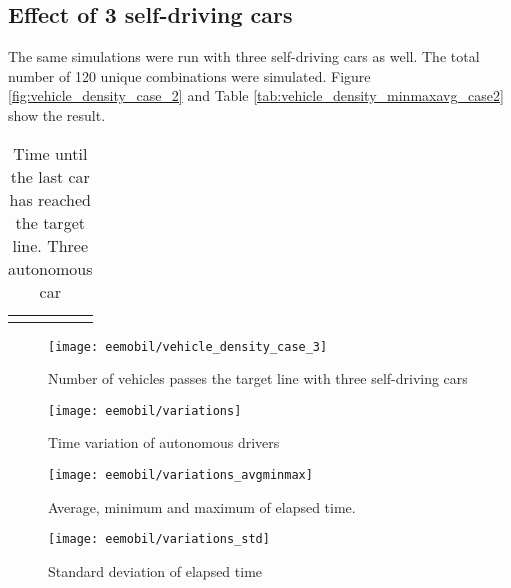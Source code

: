 		\subsection{Effect of 3 self-driving cars}
		The same simulations were run with three self-driving cars as well. The total number of 120 unique combinations were simulated. Figure \ref{fig:vehicle_density_case_2} and Table \ref{tab:vehicle_density_minmaxavg_case2} show the result.
		\begin{table}[ht]
			\begin{center}
				\begin{tabular}{ |c|c|c|c|}
					\hline
					\vehicledensitytable{3}
					\hline
				\end{tabular}
			\end{center}
			\caption{Time until the last car has reached the target line. Three autonomous car}
			\label{tab:vehicle_density_minmaxavg_case3}
		\end{table}
		\begin{figure}[ht]
			\centering
			\texttt{[image: eemobil/vehicle\_density\_case\_3]}
			\caption{Number of vehicles passes the target line with three self-driving cars}
			\label{fig:vehicle_density_case_3}
		\end{figure}
		
		\begin{figure}
			\centering
			\texttt{[image: eemobil/variations]}
			\caption{Time variation of autonomous drivers}
			\label{fig:self_variations}
		\end{figure}
		\begin{figure}
			\centering
			\texttt{[image: eemobil/variations\_avgminmax]}
			\caption{Average, minimum and maximum of elapsed time.}
			\label{fig:self_variations_avgminmax}
		\end{figure}
		\begin{figure}
			\centering
			\texttt{[image: eemobil/variations\_std]}
			\caption{Standard deviation of elapsed time}
			\label{fig:self_variations_std}
		\end{figure}
